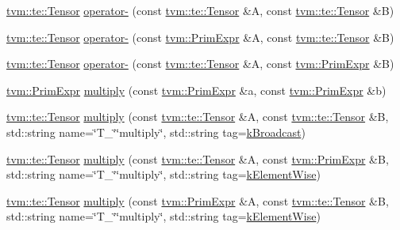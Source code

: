 \begin{DoxyCompactItemize}
\item 
\hyperlink{classtvm_1_1te_1_1Tensor}{tvm\+::te\+::\+Tensor} \hyperlink{namespacetopi_a2508d6ce372f5ea002854d0b55a56088}{operator-\/} (const \hyperlink{classtvm_1_1te_1_1Tensor}{tvm\+::te\+::\+Tensor} \&A, const \hyperlink{classtvm_1_1te_1_1Tensor}{tvm\+::te\+::\+Tensor} \&B)
\item 
\hyperlink{classtvm_1_1te_1_1Tensor}{tvm\+::te\+::\+Tensor} \hyperlink{namespacetopi_aee9a45f2ccc19bb83a737d897dfb92c6}{operator-\/} (const \hyperlink{classtvm_1_1PrimExpr}{tvm\+::\+Prim\+Expr} \&A, const \hyperlink{classtvm_1_1te_1_1Tensor}{tvm\+::te\+::\+Tensor} \&B)
\item 
\hyperlink{classtvm_1_1te_1_1Tensor}{tvm\+::te\+::\+Tensor} \hyperlink{namespacetopi_a53d191aeb501d1518deef6fb240f9871}{operator-\/} (const \hyperlink{classtvm_1_1te_1_1Tensor}{tvm\+::te\+::\+Tensor} \&A, const \hyperlink{classtvm_1_1PrimExpr}{tvm\+::\+Prim\+Expr} \&B)
\item 
\hyperlink{classtvm_1_1PrimExpr}{tvm\+::\+Prim\+Expr} \hyperlink{namespacetopi_ac3e9e4fa02b05853c13be69ec595aad7}{multiply} (const \hyperlink{classtvm_1_1PrimExpr}{tvm\+::\+Prim\+Expr} \&a, const \hyperlink{classtvm_1_1PrimExpr}{tvm\+::\+Prim\+Expr} \&b)
\item 
\hyperlink{classtvm_1_1te_1_1Tensor}{tvm\+::te\+::\+Tensor} \hyperlink{namespacetopi_a3ab00c6b819b503212be1c9c0f6253d0}{multiply} (const \hyperlink{classtvm_1_1te_1_1Tensor}{tvm\+::te\+::\+Tensor} \&A, const \hyperlink{classtvm_1_1te_1_1Tensor}{tvm\+::te\+::\+Tensor} \&B, std\+::string name=\char`\"{}T\+\_\+\char`\"{}\char`\"{}multiply\char`\"{}, std\+::string tag=\hyperlink{namespacetopi_a794b9155e9ba9d1c9c42a1cff1fb645f}{k\+Broadcast})
\item 
\hyperlink{classtvm_1_1te_1_1Tensor}{tvm\+::te\+::\+Tensor} \hyperlink{namespacetopi_a4adfe523589e41a89d7a98aa56fb17b8}{multiply} (const \hyperlink{classtvm_1_1te_1_1Tensor}{tvm\+::te\+::\+Tensor} \&A, const \hyperlink{classtvm_1_1PrimExpr}{tvm\+::\+Prim\+Expr} \&B, std\+::string name=\char`\"{}T\+\_\+\char`\"{}\char`\"{}multiply\char`\"{}, std\+::string tag=\hyperlink{namespacetopi_ac1b34ed59d38a5f5338bee6b2cad42be}{k\+Element\+Wise})
\item 
\hyperlink{classtvm_1_1te_1_1Tensor}{tvm\+::te\+::\+Tensor} \hyperlink{namespacetopi_a91b5fb70ebd79ef901464795ef3abfc2}{multiply} (const \hyperlink{classtvm_1_1PrimExpr}{tvm\+::\+Prim\+Expr} \&A, const \hyperlink{classtvm_1_1te_1_1Tensor}{tvm\+::te\+::\+Tensor} \&B, std\+::string name=\char`\"{}T\+\_\+\char`\"{}\char`\"{}multiply\char`\"{}, std\+::string tag=\hyperlink{namespacetopi_ac1b34ed59d38a5f5338bee6b2cad42be}{k\+Element\+Wise})

\end{DoxyCompactItemize}
